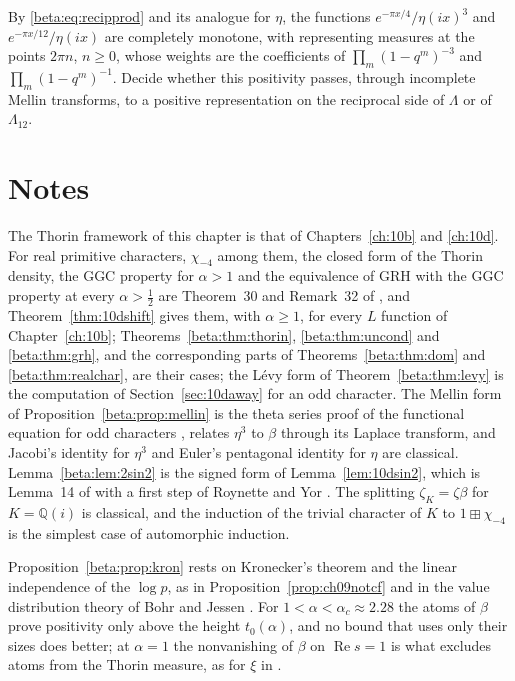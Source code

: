 \begin{problem}\label{op:betarecip}
By \eqref{beta:eq:recipprod} and its analogue for $\eta$, the functions $e^{-\pi x/4}/\eta(ix)^3$ and $e^{-\pi x/12}/\eta(ix)$ are completely monotone, with representing measures at the points $2\pi n$, $n\ge0$, whose weights are the coefficients of $\prod_m(1-q^m)^{-3}$ and $\prod_m(1-q^m)^{-1}$. Decide whether this positivity passes, through incomplete Mellin transforms, to a positive representation on the reciprocal side of $\Lambda$ or of $\Lambda_{12}$.
\end{problem}


\section{Notes}

The Thorin framework of this chapter is that of Chapters~\ref{ch:10b} and \ref{ch:10d}. For real primitive characters, $\chi_{-4}$ among them, the closed form of the Thorin density, the GGC property for $\alpha>1$ and the equivalence of GRH with the GGC property at every $\alpha>\tfrac12$ are Theorem~30 and Remark~32 of \cite{polson2018vdp}, and Theorem~\ref{thm:10dshift} gives them, with $\alpha\ge1$, for every $L$ function of Chapter~\ref{ch:10b}; Theorems~\ref{beta:thm:thorin}, \ref{beta:thm:uncond} and \ref{beta:thm:grh}, and the corresponding parts of Theorems~\ref{beta:thm:dom} and \ref{beta:thm:realchar}, are their cases; the L\'evy form of Theorem~\ref{beta:thm:levy} is the computation of Section~\ref{sec:10daway} for an odd character. The Mellin form of Proposition~\ref{beta:prop:mellin} is the theta series proof of the functional equation for odd characters \cite{iwanieckowalski2004}, \cite[Section~8.1]{polson2018vdp} relates $\eta^3$ to $\beta$ through its Laplace transform, and Jacobi's identity for $\eta^3$ and Euler's pentagonal identity for $\eta$ are classical. Lemma~\ref{beta:lem:2sin2} is the signed form of Lemma~\ref{lem:10dsin2}, which is Lemma~14 of \cite{polson2018vdp} with a first step of Roynette and Yor \cite{roynetteyor2005}. The splitting $\zeta_K=\zeta\beta$ for $K=\mathbb Q(i)$ is classical, and the induction of the trivial character of $K$ to $1\boxplus\chi_{-4}$ is the simplest case of automorphic induction.

Proposition~\ref{beta:prop:kron} rests on Kronecker's theorem and the linear independence of the $\log p$, as in Proposition~\ref{prop:ch09notcf} and in the value distribution theory of Bohr and Jessen \cite{bohrjessen1930}. For $1<\alpha<\alpha_c\approx2.28$ the atoms of $\beta$ prove positivity only above the height $t_0(\alpha)$, and no bound that uses only their sizes does better; at $\alpha=1$ the nonvanishing of $\beta$ on $\operatorname{Re}s=1$ is what excludes atoms from the Thorin measure, as for $\xi$ in \cite[Remark~21]{polson2018vdp}.

